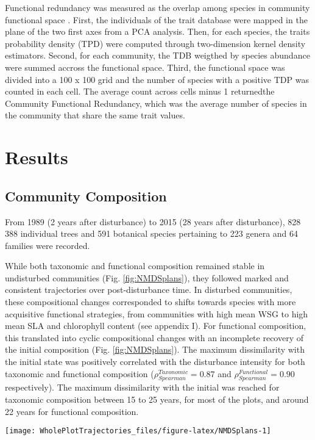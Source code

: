 \documentclass[fleqn,10pt]{ArtEcoFoG} %
\begin{document}
Functional redundancy was measured as the overlap among species in
community functional space \citep{Carmona2016}. First, the individuals
of the trait database were mapped in the plane of the two first axes
from a PCA analysis. Then, for each species, the traits probability
density (TPD) were computed through two-dimension kernel density
estimators. Second, for each community, the TDB weigthed by species
abundance were summed accross the functional space. Third, the
functional space was divided into a 100 x 100 grid and the number of
species with a positive TDP was counted in each cell. The average count
across cells minus 1 returnedthe Community Functional Redundancy, which
was the average number of species in the community that share the same
trait values.

\section{Results}\label{results}

\subsection{Community Composition}\label{community-composition}

From 1989 (2 years after disturbance) to 2015 (28 years after
disturbance), 828 388 individual trees and 591 botanical species
pertaining to 223 genera and 64 families were recorded.

While both taxonomic and functional composition remained stable in
undisturbed communities (Fig. \ref{fig:NMDSplans}), they followed marked
and consistent trajectories over post-\break disturbance time. In
disturbed communities, these compositional changes corresponded to
shifts towards species with more acquisitive functional strategies, from
communities with high mean WSG to high mean SLA and chlorophyll content
(see appendix I). For functional composition, this translated into
cyclic compositional changes with an incomplete recovery of the initial
composition (Fig. \ref{fig:NMDSplans}). The maximum dissimilarity with
the initial state was positively correlated with the disturbance
intensity for both taxonomic and functional composition
(\(\rho_{Spearman}^{Taxonomic}=0.87\) and
\(\rho_{Spearman}^{Functional}=0.90\) respectively). The maximum
dissimilarity with the initial was reached for taxonomic composition
between 15 to 25 years, for most of the plots, and around 22 years for
functional composition.

\begin{figure*}

{\centering \texttt{[image: WholePlotTrajectories\_files/figure-latex/NMDSplans-1]} 

}

\caption{Plot trajectories in terms of taxonomic composition (\textbf{(a)} and \textbf{(c)}) and functional composition (\textbf{(b)} and \textbf{(d)}) in a two-dimensional NMDS plan. Lower panels (\textbf{(c)} and \textbf{(d)}) represent the Euclidean distance to initial condition along the 30 sampled years. Shaded areas are the credibility intervals.}\label{fig:NMDSplans}
\end{figure*}
\end{document}
